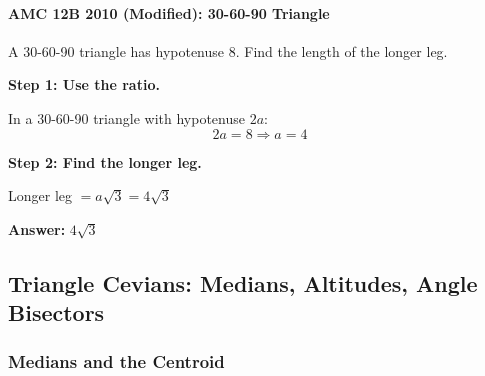 ﻿\documentclass[12pt]{extarticle}
\begin{document}
\paragraph{AMC 12B 2010 (Modified): 30-60-90 Triangle}

A 30-60-90 triangle has hypotenuse 8. Find the length of the longer leg.

\begin{solutionbox}
\textbf{Step 1: Use the ratio.}

In a 30-60-90 triangle with hypotenuse $2a$:
\[2a = 8 \Rightarrow a = 4\]

\textbf{Step 2: Find the longer leg.}

Longer leg $= a\sqrt{3} = 4\sqrt{3}$

\textbf{Answer:} $\boxed{4\sqrt{3}}$
\end{solutionbox}

\subsection{Triangle Cevians: Medians, Altitudes, Angle Bisectors}

\subsubsection{Medians and the Centroid}
\end{document}
